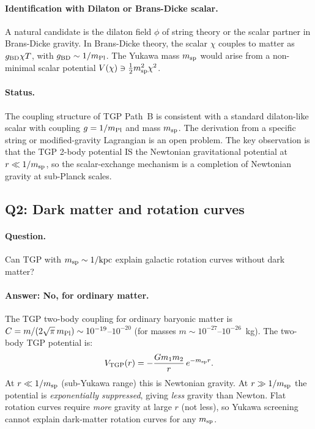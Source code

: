 \paragraph{Identification with Dilaton or Brans-Dicke scalar.}
A natural candidate is the dilaton field $\phi$ of string theory or the
scalar partner in Brans-Dicke gravity.  In Brans-Dicke theory, the scalar
$\chi$ couples to matter as $g_{\rm BD}\chi T$, with $g_{\rm BD}\sim1/m_{\rm Pl}$.
The Yukawa mass $m_{\rm sp}$ would arise from a non-minimal scalar potential
$V(\chi)\ni\frac{1}{2}m_{\rm sp}^2\chi^2$.

\paragraph{Status.}
The coupling structure of TGP Path~B is consistent with a standard
dilaton-like scalar with coupling $g=1/m_{\rm Pl}$ and mass $m_{\rm sp}$.
The derivation from a specific string or modified-gravity Lagrangian
is an open problem.  The key observation is that the TGP 2-body
potential IS the Newtonian gravitational potential at $r\ll1/m_{\rm sp}$,
so the scalar-exchange mechanism is a completion of Newtonian gravity
at sub-Planck scales.

\subsection{Q2: Dark matter and rotation curves}
\label{sec:dark_matter}

\paragraph{Question.}
Can TGP with $m_{\rm sp}\sim1/{\rm kpc}$ explain galactic rotation curves
without dark matter?

\paragraph{Answer: No, for ordinary matter.}
The TGP two-body coupling for ordinary baryonic matter is
$C = m/(2\sqrt{\pi}\,m_{\rm Pl}) \sim 10^{-19}$--$10^{-20}$
(for masses $m\sim10^{-27}$--$10^{-26}$~kg).
The two-body TGP potential is:
\begin{equation}
  V_{\rm TGP}(r) = -\frac{G m_1 m_2}{r}\,e^{-m_{\rm sp}r}.
\end{equation}
At $r\ll1/m_{\rm sp}$ (sub-Yukawa range) this is Newtonian gravity.
At $r\gg1/m_{\rm sp}$ the potential is \emph{exponentially suppressed},
giving \emph{less} gravity than Newton.  Flat rotation curves require
\emph{more} gravity at large $r$ (not less), so Yukawa screening
cannot explain dark-matter rotation curves for any $m_{\rm sp}$.

